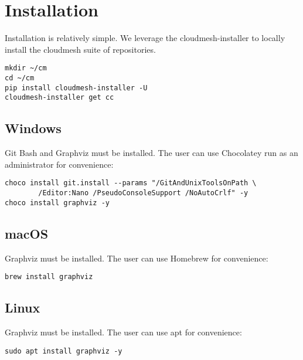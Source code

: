 \section{Installation}\label{installation}

Installation is relatively simple. We leverage the cloudmesh-installer
to locally install the cloudmesh suite of repositories.

\begin{verbatim}
mkdir ~/cm
cd ~/cm
pip install cloudmesh-installer -U
cloudmesh-installer get cc
\end{verbatim}

\subsection{Windows}\label{windows}

Git Bash and Graphviz must be installed. The user can use Chocolatey run
as an administrator for convenience:

\begin{verbatim}
choco install git.install --params "/GitAndUnixToolsOnPath \
        /Editor:Nano /PseudoConsoleSupport /NoAutoCrlf" -y
choco install graphviz -y
\end{verbatim}

\subsection{macOS}\label{macos}

Graphviz must be installed. The user can use Homebrew for convenience:

\begin{verbatim}
brew install graphviz
\end{verbatim}

\hypertarget{linux}{%
\subsection{Linux}\label{linux}}

Graphviz must be installed. The user can use apt for convenience:

\begin{verbatim}
sudo apt install graphviz -y
\end{verbatim}
